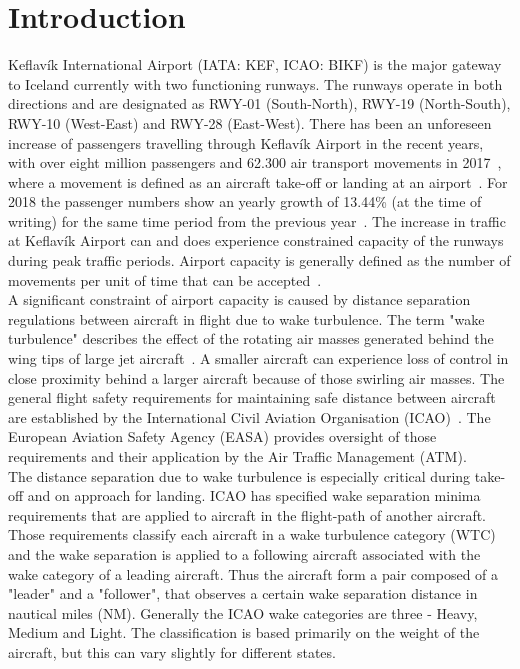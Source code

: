 \chapter{Introduction\label{cha:introduction}}


Keflavík International Airport (IATA: KEF, ICAO: BIKF) is the major gateway to Iceland currently with two functioning runways. The runways operate in both directions and are designated as RWY-01 (South-North), RWY-19 (North-South), RWY-10 (West-East) and RWY-28 (East-West). 
There has been an unforeseen increase of passengers travelling through Keflavík Airport in the recent years, with over eight million passengers and 62.300 air transport movements in 2017~\cite{isavia_facts_2017}, where a movement is defined as an aircraft take-off or landing at an airport~\cite{aircraft_movement}. For 2018 the passenger numbers show an yearly growth of 13.44\% (at the time of writing) for the same time period from the previous year~\cite{isavia_pass_statistics_2018}. The increase in traffic at Keflavík Airport can and does experience constrained capacity of the runways during peak traffic periods. Airport capacity is generally defined as the number of movements per unit of time that can be accepted~\cite{airport_capacity_methodology}.  \\
A significant constraint of airport capacity is caused by distance separation regulations between aircraft in flight due to wake turbulence. The term "wake turbulence" describes the effect of the rotating air masses generated behind the wing tips of large jet aircraft~\cite{doc4444full}. A smaller aircraft can experience loss of control in close proximity behind a larger aircraft because of those swirling air masses. The general flight safety requirements for maintaining safe distance between aircraft are established by the International Civil Aviation Organisation (ICAO)~\cite{doc4444full}. The European Aviation Safety Agency (EASA) provides oversight of those requirements and their application by the Air Traffic Management (ATM). \\
The distance separation due to wake turbulence is especially critical during take-off and on approach for landing. ICAO has specified wake separation minima requirements that are applied to aircraft in the flight-path of another aircraft. Those requirements classify each aircraft in a wake turbulence category (WTC) and the wake separation is applied to a following aircraft associated with the wake category of a leading aircraft. Thus the aircraft form a pair composed of a "leader" and a "follower", that observes a certain wake separation distance in nautical miles (NM). Generally the ICAO wake categories are three - Heavy, Medium and Light. The classification is based primarily on the weight of the aircraft, but this can vary slightly for different states.\\
